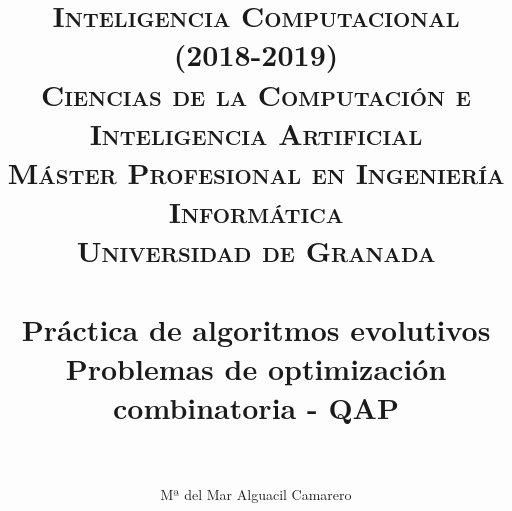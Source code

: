 


\usepackage{enumerate}
\usepackage{subfig} %
\usepackage{multirow} %
\usepackage[table]{xcolor}
\usepackage{slashbox} %

\usepackage{anysize}
\marginsize{2.5cm}{2.5cm}{2cm}{2cm} %

\usepackage[colorlinks=true, citecolor=red, urlcolor=blue]{hyperref}


\title{
\normalfont \normalsize
\textsc{{\bfseries Inteligencia Computacional (2018-2019)} \\
			Ciencias de la Computación e Inteligencia Artificial\\[0.5cm]
			Máster Profesional en Ingeniería Informática\\ Universidad de Granada}
			\\ [25pt] %
\horrule{0.5pt} \\[0.4cm] %
\bfseries \huge Práctica de algoritmos evolutivos \\%
\Large Problemas de optimización combinatoria - QAP\\
\horrule{2pt} \\[0.5cm] %
}

\author{Mª del Mar Alguacil Camarero} %

\date{} %




\maketitle %

\newpage %

\tableofcontents %

